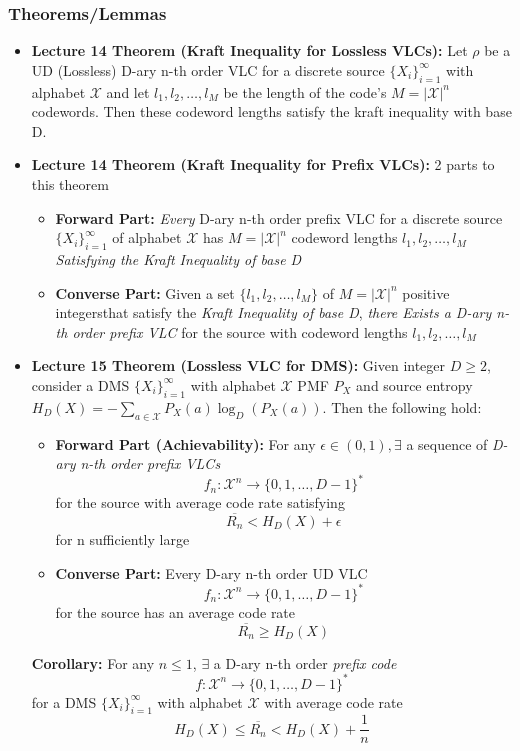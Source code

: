 \documentclass{article}
\begin{document}
\subsubsection{Theorems/Lemmas}
\begin{itemize}
    \item \textbf{Lecture 14 Theorem (Kraft Inequality for Lossless VLCs): } Let \(\rho\) be a UD (Lossless) D-ary n-th order VLC for a discrete source \(\{X_i\}^\infty_{i=1}\) with alphabet \(\mathcal{X}\) and let \(l_1, l_2, \ldots, l_M\) be the length of the code's
    \(M = |\mathcal{X}|^n\) codewords. Then these codeword lengths satisfy the kraft inequality with base D.
    \item \textbf{Lecture 14 Theorem (Kraft Inequality for Prefix VLCs): } 2 parts to this theorem
    \begin{itemize}
        \item \textbf{Forward Part:} \textit{Every} D-ary n-th order prefix VLC for a discrete source \(\{X_i\}^\infty_{i=1}\) of alphabet \(\mathcal{X}\) has \(M = |\mathcal{X}|^n\) codeword lengths
        \(l_1, l_2, \ldots, l_M\) \textit{Satisfying the Kraft Inequality of base D}
        \item \textbf{Converse Part: } Given a set \(\{l_1, l_2, \ldots, l_M\}\) of \(M=|\mathcal{X}|^n\) positive integersthat satisfy the \textit{Kraft Inequality of base D}, \textit{there Exists a D-ary n-th order prefix VLC} for the source with codeword lengths \(l_1, l_2, \ldots, l_M\)
    \end{itemize}
    \item \textbf{Lecture 15 Theorem (Lossless VLC for DMS): } Given integer \(D \geq 2\), consider a DMS \(\{X_i\}^\infty_{i=1}\) with alphabet \(\mathcal{X}\) PMF \(P_X\)
    and source entropy \(H_D(X) = - \sum_{a\in \mathcal{X}} P_X(a) \log_D (P_X(a))\). Then the following hold:
    \begin{itemize}
        \item \textbf{Forward Part (Achievability):} For any \(\epsilon \in (0,1), \exists\) a sequence of \textit{D-ary n-th order prefix VLCs}
        \[f_n : \mathcal{X}^n \to \{0,1,\ldots, D-1\}^*\]
        for the source with average code rate satisfying
        \[\overline{R_n} < H_D(X) + \epsilon\]
        for n sufficiently large
        \item \textbf{Converse Part:} Every D-ary n-th order UD VLC
        \[f_n : \mathcal{X}^n \to \{0,1,\ldots, D-1\}^*\]
        for the source has an average code rate
        \[\overline{R_n} \geq H_D(X)\]
    \end{itemize}
    \textbf{Corollary:} For any \(n \leq 1\), \(\exists\) a D-ary n-th order \textit{prefix code}
    \[f: \mathcal{X}^n \to \{0,1,\ldots, D-1\}^*\]
    for a DMS \(\{X_i\}^\infty_{i=1}\) with alphabet \(\mathcal{X}\) with average code rate
    \[H_D(X) \leq \overline{R_n} < H_D(X) + \frac{1}{n}\]


\end{itemize}
\end{document}
